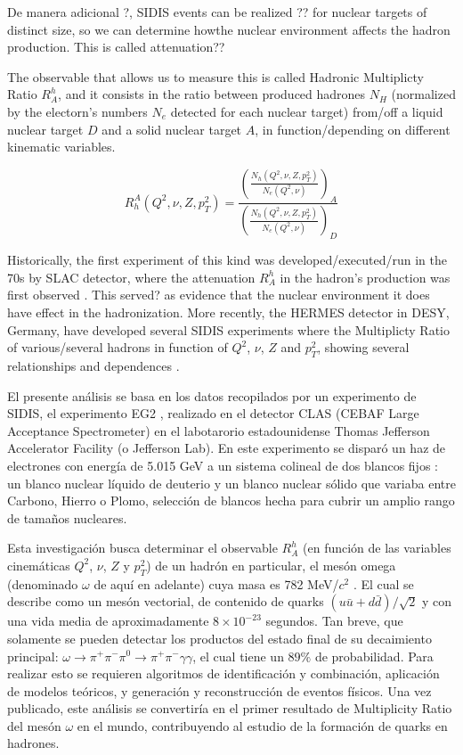 De manera adicional ?, SIDIS events can be realized ?? for nuclear targets of distinct size, so we can determine howthe nuclear environment affects the hadron production. This is called attenuation??

The observable that allows us to measure this is called Hadronic Multiplicty Ratio $R^h_A$, and it consists in the ratio between produced hadrones $N_H$ (normalized by the electorn's numbers $N_e$ detected for each nuclear target) from/off a liquid nuclear target $D$ and a solid nuclear target $A$, in function/depending on different kinematic variables.

\begin{equation*}
    R_h^A (Q^2, \nu, Z, p_T^2) = \frac{\left( \frac{N_h(Q^2, \nu, Z, p_T^2)}{N_e(Q^2, \nu)} \right)_A}{\left( \frac{N_h(Q^2, \nu, Z, p_T^2)}{N_e(Q^2, \nu)} \right)_D}
\end{equation*}

Historically, the first experiment of this kind was developed/executed/run in the 70s by SLAC detector, where the attenuation $R^h_A$ in the hadron's production was first observed \cite{slac}. This served? as evidence that the nuclear environment it does have effect in the hadronization. More recently, the HERMES detector in DESY, Germany, have developed several SIDIS experiments where the Multiplicty Ratio of various/several hadrons in function of $Q^2$, $\nu$, $Z$ and $p_T^2$, showing several relationships and dependences \cite{hermes1, hermes2}.

El presente análisis se basa en los datos recopilados por un experimento de SIDIS, el experimento EG2 \cite{eg2}, realizado en el detector CLAS (CEBAF Large Acceptance Spectrometer) \cite{clas} en el labotarorio estadounidense Thomas Jefferson Accelerator Facility (o Jefferson Lab). En este experimento se disparó un haz de electrones con energía de 5.015 GeV a un sistema colineal de dos blancos fijos \cite{target}: un blanco nuclear líquido de deuterio y un blanco nuclear sólido que variaba entre Carbono, Hierro o Plomo, selección de blancos hecha para cubrir un amplio rango de tamaños nucleares.

Esta investigación busca determinar el observable $R^h_A$ (en función de las variables cinemáticas $Q^2$, $\nu$, $Z$ y $p_T^2$) de un hadrón en particular, el mesón omega (denominado $\omega$ de aquí en adelante) cuya masa es 782 MeV/$c^2$ \cite{pdg}. El cual se describe como un mesón vectorial, de contenido de quarks $(u \bar{u} + d  \bar{d})/\sqrt{2}$ y con una vida media de aproximadamente $8 \times 10^{-23}$ segundos. Tan breve, que solamente se pueden detectar los productos del estado final de su decaimiento principal: $\omega \rightarrow \pi^+ \pi^{-} \pi^0 \rightarrow  \pi^+ \pi^{-} \gamma \gamma$, el cual tiene un $89\%$ de probabilidad. Para realizar esto se requieren algoritmos de identificación y combinación, aplicación de modelos teóricos, y generación y reconstrucción de eventos físicos. Una vez publicado, este análisis se convertiría en el primer resultado de Multiplicity Ratio del mesón $\omega$ en el mundo, contribuyendo al estudio de la formación de quarks en hadrones.

